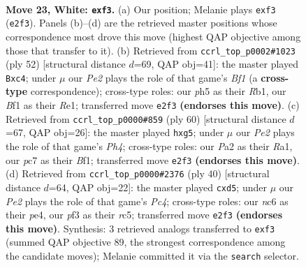 \documentclass[11pt]{article}
\begin{document}
\clearpage

\begin{figure}[p]\centering
\begin{subfigure}{0.46\textwidth}\centering
\resizebox{\linewidth}{!}{%
\newchessgame
\chessboard[
  setfen={1rb2r2/p1pp1pk1/2n1p3/2R4p/8/5pP1/PP1BPP1P/4KB1R w - - 0 23},
  showmover=false,
  pgfstyle=straightmove, color=movearrow, markmove={e2-f3}
]}
\caption{}
\end{subfigure}\hfill
\begin{subfigure}{0.46\textwidth}\centering
\resizebox{\linewidth}{!}{%
\newchessgame
\chessboard[
  setfen={4r1k1/3pBrpp/b2Pp3/2p2p2/p1n4P/2P5/P4PP1/1R2RBK1 w - - 0 27},
  showmover=false,
  pgfstyle=straightmove, color=movearrow, markmove={f1-c4}
]}
\caption{}
\end{subfigure}
\\[4pt]
\begin{subfigure}{0.46\textwidth}\centering
\resizebox{\linewidth}{!}{%
\newchessgame
\chessboard[
  setfen={2r2r2/5p1k/4pn1p/1R1b2p1/2pP3P/2P2PB1/6P1/R4BK1 w - - 0 31},
  showmover=false,
  pgfstyle=straightmove, color=movearrow, markmove={h4-g5}
]}
\caption{}
\end{subfigure}\hfill
\begin{subfigure}{0.46\textwidth}\centering
\resizebox{\linewidth}{!}{%
\newchessgame
\chessboard[
  setfen={5b1r/1p3k1p/p3p3/2rp4/2PRpP2/8/PP4PP/1K3B1R w - - 0 21},
  showmover=false,
  pgfstyle=straightmove, color=movearrow, markmove={c4-d5}
]}
\caption{}
\end{subfigure}
\caption{\textbf{Move 23, White: \texttt{exf3}.} (a) Our position; Melanie plays \texttt{exf3} (\texttt{e2f3}). Panels (b)--(d) are the retrieved master positions whose correspondence most drove this move (highest QAP objective among those that transfer to it). (b) Retrieved from \texttt{ccrl\_top\_p0002\#1023} (ply 52) [structural distance $d$=69, QAP obj=41]: the master played \texttt{Bxc4}; under $\mu$ our \emph{Pe2} plays the role of that game's \emph{Bf1} (a \textbf{cross-type} correspondence); cross-type roles: our \emph{p}h5 as their \emph{R}b1, our \emph{B}f1 as their \emph{R}e1; transferred move \texttt{e2f3} \textbf{(endorses this move)}. (c) Retrieved from \texttt{ccrl\_top\_p0000\#859} (ply 60) [structural distance $d$=67, QAP obj=26]: the master played \texttt{hxg5}; under $\mu$ our \emph{Pe2} plays the role of that game's \emph{Ph4}; cross-type roles: our \emph{P}a2 as their \emph{R}a1, our \emph{p}c7 as their \emph{B}f1; transferred move \texttt{e2f3} \textbf{(endorses this move)}. (d) Retrieved from \texttt{ccrl\_top\_p0000\#2376} (ply 40) [structural distance $d$=64, QAP obj=22]: the master played \texttt{cxd5}; under $\mu$ our \emph{Pe2} plays the role of that game's \emph{Pc4}; cross-type roles: our \emph{n}c6 as their \emph{p}e4, our \emph{p}f3 as their \emph{r}c5; transferred move \texttt{e2f3} \textbf{(endorses this move)}. Synthesis: 3 retrieved analogs transferred to \texttt{exf3} (summed QAP objective 89, the strongest correspondence among the candidate moves); Melanie committed it via the \texttt{search} selector.}
\label{fig:thought-m44}
\end{figure}
\end{document}
